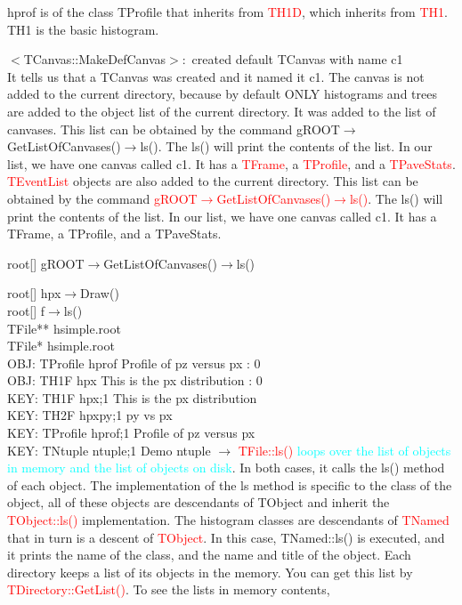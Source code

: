 \documentclass[12pt,a4paper]{article}
\begin{document}
hprof is of the class TProfile that inherits from \textcolor{red}{TH1D}, which inherits from \textcolor{red}{TH1}. TH1 is the basic histogram.

$<$TCanvas::MakeDefCanvas$>:$ created default TCanvas with name c1 \\

It tells us that a TCanvas was created and it named it c1. The canvas is not added to the current directory, because by default ONLY histograms and trees are added to the object list of the current directory. It was added to the list of canvases. This list can be obtained by the command gROOT$\rightarrow$GetListOfCanvases()$\rightarrow$ls(). The ls() will print the contents of the list. In our list, we have one canvas called c1. It has a \textcolor{red}{TFrame}, a \textcolor{red}{TProfile}, and a \textcolor{red}{TPaveStats}. \textcolor{red}{TEventList} objects are also added to the current directory. This list can be obtained by the command \textcolor{red}{gROOT$\rightarrow$GetListOfCanvases()$\rightarrow$ls()}. The ls() will print the contents of the list. In our list, we have one canvas called c1. It has a TFrame, a TProfile, and a TPaveStats.

root[] gROOT$\rightarrow$GetListOfCanvases()$\rightarrow$ls()

root[] hpx$\rightarrow$Draw() \\
root[] f$\rightarrow$ls() \\
TFile** hsimple.root \\
TFile* hsimple.root \\
OBJ: TProfile hprof Profile of pz versus px : 0 \\
OBJ: TH1F hpx This is the px distribution : 0 \\
KEY: TH1F hpx;1 This is the px distribution \\
KEY: TH2F hpxpy;1 py vs px \\
KEY: TProfile hprof;1 Profile of pz versus px \\
KEY: TNtuple ntuple;1 Demo ntuple
$\rightarrow$
\textcolor{red}{TFile::ls()} \textcolor{cyan}{loops over the list of objects in memory and the list of objects on disk}. In both cases, it calls the ls() method of each object. The implementation of the ls method is specific to the class of the object, all of these objects are descendants of TObject and inherit the \textcolor{red}{TObject::ls()} implementation. The histogram classes are descendants of \textcolor{red}{TNamed} that in turn is a descent of \textcolor{red}{TObject}. In this case, TNamed::ls() is executed, and it prints the name of the class, and the name and title of the object. Each directory keeps a list of its objects in the memory. You can get this list by \textcolor{red}{TDirectory::GetList()}. To see the lists in memory contents,
\end{document}
